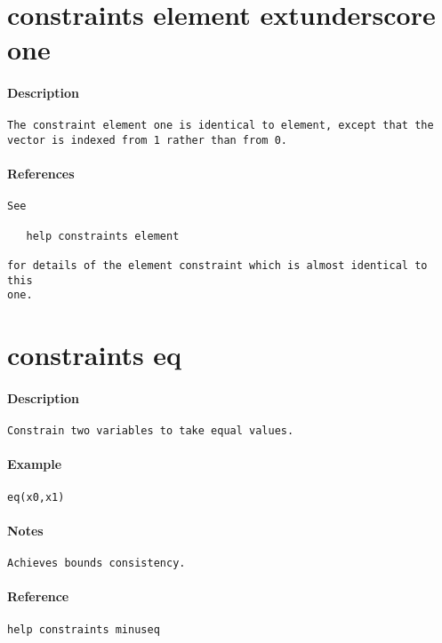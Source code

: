 \section{constraints element	extunderscore one}
\paragraph{Description}
{\footnotesize
\begin{verbatim}
The constraint element one is identical to element, except that the
vector is indexed from 1 rather than from 0.
\end{verbatim}
}
\paragraph{References}
{\footnotesize
\begin{verbatim}
See

   help constraints element

for details of the element constraint which is almost identical to this
one.
\end{verbatim}
}
\section{constraints eq}
\paragraph{Description}
{\footnotesize
\begin{verbatim}
Constrain two variables to take equal values.
\end{verbatim}
}
\paragraph{Example}
{\footnotesize
\begin{verbatim}
eq(x0,x1)
\end{verbatim}
}
\paragraph{Notes}
{\footnotesize
\begin{verbatim}
Achieves bounds consistency.
\end{verbatim}
}
\paragraph{Reference}
{\footnotesize
\begin{verbatim}
help constraints minuseq
\end{verbatim}
}
